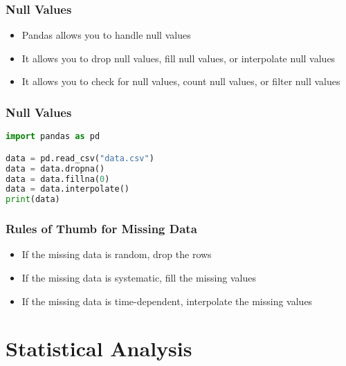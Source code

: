 \documentclass[serif, 9pt, aspectratio=32]{beamer}
\begin{document}
\begin{frame}
    \centering
    \frametitle{Null Values}
    \begin{itemize}
        \setlength{\itemsep}{2em}
        \item Pandas allows you to handle null values
        \item It allows you to drop null values, fill null values, or interpolate null values
        \item It allows you to check for null values, count null values, or filter null values
    \end{itemize}
\end{frame}

\begin{frame}[fragile]
    \frametitle{Null Values}
    \begin{lstlisting}[language=Python]
import pandas as pd

data = pd.read_csv("data.csv")
data = data.dropna()
data = data.fillna(0)
data = data.interpolate()
print(data)
    \end{lstlisting}
\end{frame}

\begin{frame}
    \centering
    \frametitle{Rules of Thumb for Missing Data}
    \begin{itemize}
        \setlength{\itemsep}{2em}
        \item If the missing data is random, drop the rows
        \item If the missing data is systematic, fill the missing values
        \item If the missing data is time-dependent, interpolate the missing values
    \end{itemize}
\end{frame}

\section{Statistical Analysis}
\end{document}
